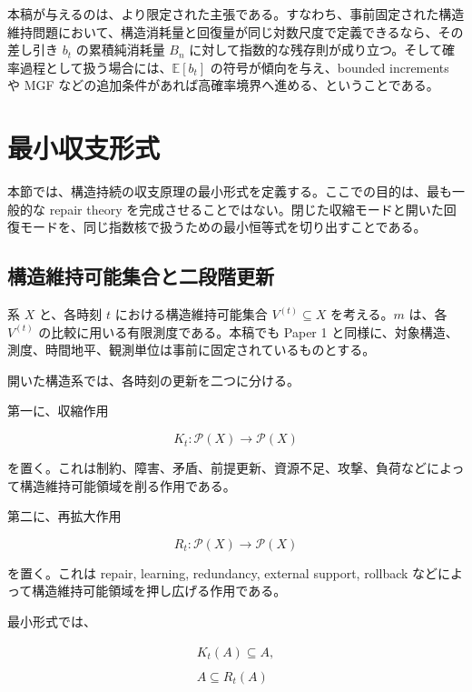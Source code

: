 \documentclass[12pt,a4paper]{article}
\begin{document}
本稿が与えるのは、より限定された主張である。すなわち、事前固定された構造維持問題において、構造消耗量と回復量が同じ対数尺度で定義できるなら、その差し引き \(b_{t}\) の累積純消耗量 \(B_{n}\) に対して指数的な残存則が成り立つ。そして確率過程として扱う場合には、\(\mathbb E[b_{t}]\) の符号が傾向を与え、bounded increments や MGF などの追加条件があれば高確率境界へ進める、ということである。

\section{最小収支形式}\label{ux6700ux5c0fux53ceux652fux5f62ux5f0f}

本節では、構造持続の収支原理の最小形式を定義する。ここでの目的は、最も一般的な repair theory を完成させることではない。閉じた収縮モードと開いた回復モードを、同じ指数核で扱うための最小恒等式を切り出すことである。

\subsection{構造維持可能集合と二段階更新}\label{ux69cbux9020ux7dadux6301ux53efux80fdux96c6ux5408ux3068ux4e8cux6bb5ux968eux66f4ux65b0}

系 \(X\) と、各時刻 \(t\) における構造維持可能集合 \(V^{(t)}\subseteq X\) を考える。\(m\) は、各 \(V^{(t)}\) の比較に用いる有限測度である。本稿でも Paper 1 と同様に、対象構造、測度、時間地平、観測単位は事前に固定されているものとする。

開いた構造系では、各時刻の更新を二つに分ける。

第一に、収縮作用

\[
K_{t} : \mathcal P(X) \to \mathcal P(X)
\]

を置く。これは制約、障害、矛盾、前提更新、資源不足、攻撃、負荷などによって構造維持可能領域を削る作用である。

第二に、再拡大作用

\[
R_{t} : \mathcal P(X) \to \mathcal P(X)
\]

を置く。これは repair, learning, redundancy, external support, rollback などによって構造維持可能領域を押し広げる作用である。

最小形式では、

\[
\begin{aligned}
K_{t}(A) \subseteq A, \\
\qquad \\
A \subseteq R_{t}(A)
\end{aligned}
\]
\end{document}
